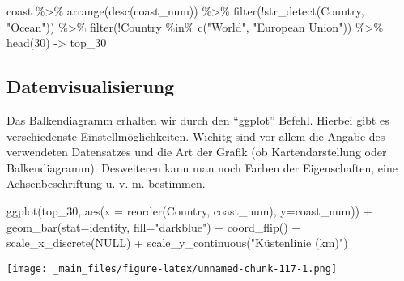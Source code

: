 \documentclass[
  ngerman,
]{article}
\newenvironment{Shaded}{\begin{snugshade}}{\end{snugshade}}
\newcommand{\AttributeTok}[1]{\textcolor[rgb]{0.77,0.63,0.00}{#1}}
\newcommand{\ConstantTok}[1]{\textcolor[rgb]{0.00,0.00,0.00}{#1}}
\newcommand{\DecValTok}[1]{\textcolor[rgb]{0.00,0.00,0.81}{#1}}
\newcommand{\FunctionTok}[1]{\textcolor[rgb]{0.00,0.00,0.00}{#1}}
\newcommand{\NormalTok}[1]{#1}
\newcommand{\OtherTok}[1]{\textcolor[rgb]{0.56,0.35,0.01}{#1}}
\newcommand{\SpecialCharTok}[1]{\textcolor[rgb]{0.00,0.00,0.00}{#1}}
\newcommand{\StringTok}[1]{\textcolor[rgb]{0.31,0.60,0.02}{#1}}
\begin{document}
\begin{Shaded}
\begin{Highlighting}[]
\NormalTok{coast }\SpecialCharTok{\%\textgreater{}\%}
  \FunctionTok{arrange}\NormalTok{(}\FunctionTok{desc}\NormalTok{(coast\_num)) }\SpecialCharTok{\%\textgreater{}\%}
  \FunctionTok{filter}\NormalTok{(}\SpecialCharTok{!}\FunctionTok{str\_detect}\NormalTok{(Country, }\StringTok{"Ocean"}\NormalTok{)) }\SpecialCharTok{\%\textgreater{}\%}
  \FunctionTok{filter}\NormalTok{(}\SpecialCharTok{!}\NormalTok{Country }\SpecialCharTok{\%in\%} \FunctionTok{c}\NormalTok{(}\StringTok{"World"}\NormalTok{, }\StringTok{"European Union"}\NormalTok{)) }\SpecialCharTok{\%\textgreater{}\%}
  \FunctionTok{head}\NormalTok{(}\DecValTok{30}\NormalTok{) }\OtherTok{{-}\textgreater{}}\NormalTok{ top\_30}
\end{Highlighting}
\end{Shaded}

\hypertarget{datenvisualisierung}{%
\subsection{Datenvisualisierung}\label{datenvisualisierung}}

Das Balkendiagramm erhalten wir durch den ``ggplot'' Befehl. Hierbei gibt es verschiedenste Einstellmöglichkeiten. Wichitg sind vor allem die Angabe des verwendeten Datensatzes und die Art der Grafik (ob Kartendarstellung oder Balkendiagramm). Desweiteren kann man noch Farben der Eigenschaften, eine Achsenbeschriftung u. v. m. bestimmen.

\begin{Shaded}
\begin{Highlighting}[]
\FunctionTok{ggplot}\NormalTok{(top\_30, }\FunctionTok{aes}\NormalTok{(}\AttributeTok{x =} \FunctionTok{reorder}\NormalTok{(Country, coast\_num), }\AttributeTok{y=}\NormalTok{coast\_num)) }\SpecialCharTok{+}
  \FunctionTok{geom\_bar}\NormalTok{(}\AttributeTok{stat=}\StringTok{\textquotesingle{}identity\textquotesingle{}}\NormalTok{, }\AttributeTok{fill=}\StringTok{"darkblue"}\NormalTok{) }\SpecialCharTok{+}
  \FunctionTok{coord\_flip}\NormalTok{() }\SpecialCharTok{+}
  \FunctionTok{scale\_x\_discrete}\NormalTok{(}\ConstantTok{NULL}\NormalTok{) }\SpecialCharTok{+}
  \FunctionTok{scale\_y\_continuous}\NormalTok{(}\StringTok{"Küstenlinie (km)"}\NormalTok{)}
\end{Highlighting}
\end{Shaded}

\texttt{[image: \_main\_files/figure-latex/unnamed-chunk-117-1.png]}
\end{document}
